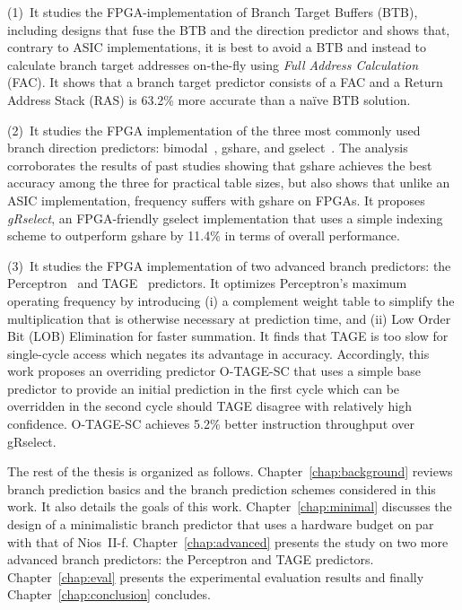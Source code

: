 (1)~It studies the FPGA-implementation of Branch Target Buffers (BTB), including designs that fuse the BTB and the direction predictor and shows that, contrary to ASIC implementations, it is best to avoid a BTB and instead to calculate branch target addresses on-the-fly using \textit{Full Address Calculation} (FAC). It shows that a branch target predictor consists of a FAC and a Return Address Stack (RAS) is 63.2\% more accurate than a na\"ive BTB solution.

(2)~It studies the FPGA implementation of the three most commonly used branch direction predictors: bimodal~\cite{bimodal}, gshare, and gselect~\cite{McFarling}. The analysis corroborates the results of past studies showing that gshare achieves the best accuracy among the three for practical table sizes, but also shows that unlike an ASIC implementation, frequency suffers with gshare on FPGAs. It proposes \textit{gRselect}, an FPGA-friendly gselect implementation that uses a simple indexing scheme to outperform gshare by 11.4\% in terms of overall performance.

(3)~It studies the FPGA implementation of two advanced branch predictors: the Perceptron~\cite{perceptron} and TAGE~\cite{tage} predictors. It optimizes Perceptron's maximum operating frequency by introducing (i) a complement weight table to simplify the multiplication that is otherwise necessary at prediction time, and (ii) Low Order Bit (LOB) Elimination for faster summation. It finds that TAGE is too slow for single-cycle access which negates its advantage in accuracy. Accordingly, this work proposes an overriding predictor \mbox{O-TAGE-SC} that uses a simple base predictor to provide an initial prediction in the first cycle which can be overridden in the second cycle should TAGE disagree with relatively high confidence. \mbox{O-TAGE-SC} achieves 5.2\% better instruction throughput over gRselect.





The rest of the thesis is organized as follows. Chapter~\ref{chap:background} reviews branch prediction basics and  the branch prediction schemes considered in this work. It also details the goals of this work. Chapter~\ref{chap:minimal} discusses the design of a minimalistic branch predictor that uses a hardware budget on par with that of Nios~II-f. Chapter~\ref{chap:advanced} presents the study on two more advanced branch predictors: the Perceptron and TAGE predictors. Chapter~\ref{chap:eval} presents the experimental evaluation results and finally Chapter~\ref{chap:conclusion} concludes.






